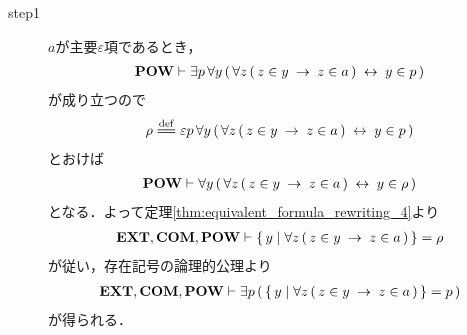 	\begin{sketch}\mbox{}
		\begin{description}
			\item[step1]
				$a$が主要$\varepsilon$項であるとき，
				\begin{align}
					\mbox{{\bf POW}} \vdash \exists p\, \forall y\, (\, \forall z\, (\, z \in y \hspace{0.25em}\rightarrow\hspace{0.25em} z \in a\, ) \hspace{0.25em}\leftrightarrow\hspace{0.25em} y \in p\, )
				\end{align}
				が成り立つので
				\begin{align}
					\rho \defeq \varepsilon p\, \forall y\, (\, \forall z\, (\, z \in y \rarrow z \in a\, ) \lrarrow y \in p\, )
				\end{align}
				とおけば
				\begin{align}
					\mbox{{\bf POW}} \vdash \forall y\, (\, \forall z\, (\, z \in y \hspace{0.25em}\rightarrow\hspace{0.25em} z \in a\, ) \hspace{0.25em}\leftrightarrow\hspace{0.25em} y \in \rho\, )
					\label{fom:power_of_a_set_is_a_set_1}
				\end{align}
				となる．よって定理\ref{thm:equivalent_formula_rewriting_4}より
				\begin{align}
					\mbox{{\bf EXT}},\mbox{\bf COM},\mbox{{\bf POW}} \vdash 
					\{\, y \mid \forall z\, (\, z \in y \hspace{0.25em}\rightarrow\hspace{0.25em} z \in a\, )\, \} = \rho
				\end{align}
				が従い，存在記号の論理的公理より
				\begin{align}
					\mbox{{\bf EXT}},\mbox{\bf COM},\mbox{{\bf POW}} \vdash \exists p\, 
					(\, \{\, y \mid \forall z\, (\, z \in y \hspace{0.25em}\rightarrow\hspace{0.25em} z \in a\, )\, \} = p\, )
				\end{align}
				が得られる．
				

\end{description}
\end{sketch}
